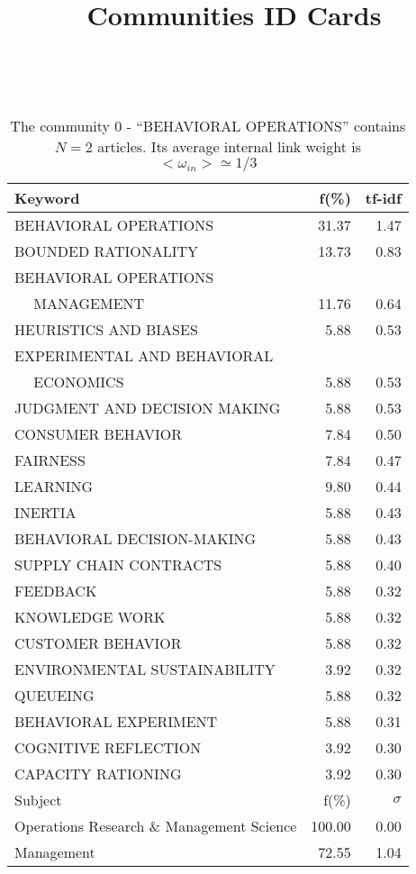 \documentclass[a4paper,11pt]{report}
\title{{\bf Communities ID Cards}}
\date{\begin{flushleft}This document gather the ``ID Cards'' of the CC communities found within your database.\\
 The CC network was built by keeping a link between articles sharing at least 5 references. The communities characterized here correspond to the ones found in the level 0 (in the sense of the Louvain algo) which gathers more than 0 articles.\\
 These ID cards displays the most frequent keywords, subject categories, journals of publication, institution, countries, authors, references and reference journals of the articles of each community. The significance of an item $\sigma = \sqrt{N} (f - p) / \sqrt{p(1-p)}$ [where $N$ is the number of articles within the community and $f$ and $p$ are the proportion of articles respectively within the community and within the database displaying that item ] is also given (for example $\sigma > 5$ is really highly significant). The tf-idf value which can be calculated by $tf-idf = f*log(frac{1}{p})$ is also given.\\
\vspace{1cm}
\copyright Sebastian Grauwin, Liu Weizhi - (2014) \end{flushleft}}
\begin{document}
\begin{landscape}
\maketitle
\clearpage

\begin{table}[!ht]
\caption{The community 0 - ``BEHAVIORAL OPERATIONS'' contains $N = 2$ articles. Its average internal link weight is $<\omega_{in}> \simeq 1/3$ }
\textcolor{white}{aa}\\
{\scriptsize\begin{tabular}{|l r  r|}
\hline
Keyword & f(\%) & tf-idf \\
\hline
BEHAVIORAL OPERATIONS & 31.37 & 1.47\\
BOUNDED RATIONALITY & 13.73 & 0.83\\
BEHAVIORAL OPERATIONS &  &\\
$\quad$ MANAGEMENT & 11.76 & 0.64\\
HEURISTICS AND BIASES & 5.88 & 0.53\\
EXPERIMENTAL AND BEHAVIORAL &  &\\
$\quad$ ECONOMICS & 5.88 & 0.53\\
JUDGMENT AND DECISION MAKING & 5.88 & 0.53\\
CONSUMER BEHAVIOR & 7.84 & 0.50\\
FAIRNESS & 7.84 & 0.47\\
LEARNING & 9.80 & 0.44\\
INERTIA & 5.88 & 0.43\\
BEHAVIORAL DECISION-MAKING & 5.88 & 0.43\\
SUPPLY CHAIN CONTRACTS & 5.88 & 0.40\\
FEEDBACK & 5.88 & 0.32\\
KNOWLEDGE WORK & 5.88 & 0.32\\
CUSTOMER BEHAVIOR & 5.88 & 0.32\\
ENVIRONMENTAL SUSTAINABILITY & 3.92 & 0.32\\
QUEUEING & 5.88 & 0.32\\
BEHAVIORAL EXPERIMENT & 5.88 & 0.31\\
COGNITIVE REFLECTION & 3.92 & 0.30\\
CAPACITY RATIONING & 3.92 & 0.30\\
\hline
\hline
Subject & f(\%) & $\sigma$\\
\hline
Operations Research \& Management Science & 100.00 & 0.00\\
Management & 72.55 & 1.04\\

\end{tabular}}
\end{table}
\end{landscape}
\end{document}

